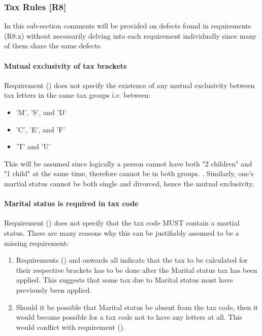 \subsubsection{Tax Rules [R8]}

In this sub-section comments will be provided on defects found in requirements (R8.x) without necessarily delving into each requirement individually since many of them share the same defects.

\paragraph{Mutual exclusivity of tax brackets}
Requirement (\REightFour) does not specify the existence of any mutual exclusivity between tax letters in the same tax groups i.e. between: 
\begin{itemize}[noitemsep]
\item 'M', 'S', and 'D' 
\item 'C', 'E', and 'F'
\item 'T' and 'U'
\end{itemize}
This will be assumed since logically a person cannot have both "2 children" and "1 child" at the same time, therefore cannot be in both groups. . Similarly, one's martial status cannot be both single and divorced, hence the mutual exclusivity.  

\paragraph{Marital status is required in tax code}
Requirement (\REightFour) does not specify that the tax code MUST contain a martial status. There are many reasons why this can be justifiably assumed to be a missing requirement: 
\begin{enumerate}
	\item Requirements (\REightEight) and onwards all indicate that the tax to be calculated for their respective brackets has to be done after the Marital status tax has been applied. This suggests that some tax due to Marital status must have previously been applied. 
	\item Should it be possible that Marital status be absent from the tax code, then it would become possible for a tax code not to have any letters at all. This would conflict with requirement (\REightTwo). %
\end{enumerate}

